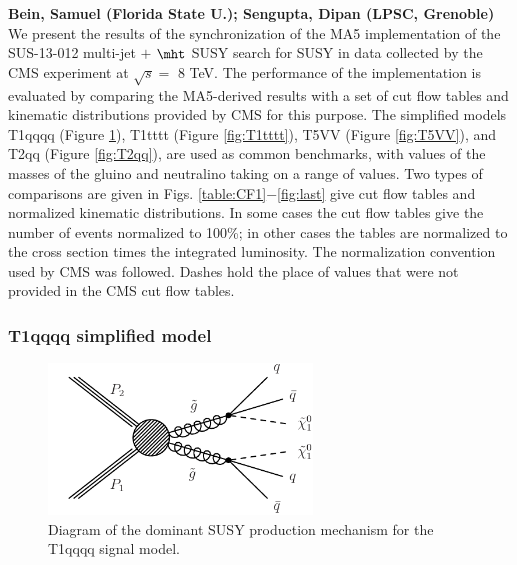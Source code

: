 \textbf{Bein, Samuel (Florida State U.); Sengupta, Dipan (LPSC, Grenoble)}\\
We present the results of the synchronization of the MA5
implementation of the SUS-13-012 multi-jet $+$ $\mht$ SUSY search for SUSY in data collected 
by the CMS experiment at $\sqrt{s}=$ 8 TeV.  The
performance of the implementation is evaluated by comparing the
MA5-derived results with a set of cut flow tables and kinematic
distributions provided by CMS for this purpose. The simplified models
T1qqqq (Figure \ref{fig:T1qqqq}), T1tttt (Figure \ref{fig:T1tttt}), T5VV (Figure \ref{fig:T5VV}), and T2qq (Figure \ref{fig:T2qq}), are used as common benchmarks, with values of the masses of the
gluino and neutralino taking on a range of values. Two types of
comparisons are given in Figs. \ref{table:CF1}$-$\ref{fig:last} give cut flow tables and normalized
kinematic distributions. In some cases the
cut flow tables give the number of events normalized to 100\%; in
other cases the tables are normalized to the cross section times the
integrated luminosity. The normalization convention used by CMS was
followed. Dashes hold the place of values that were not
provided in the CMS cut flow tables. 

\subsubsection{T1qqqq simplified model}
\begin{figure}[h!]
\centering
\includegraphics[width=7cm]{figures/Appendices/Ma5ValidationSUS13012/T1qqqq.pdf}
\caption{Diagram of the dominant SUSY production mechanism
for the T1qqqq signal model.}
\label{fig:T1qqqq}
\end{figure}

